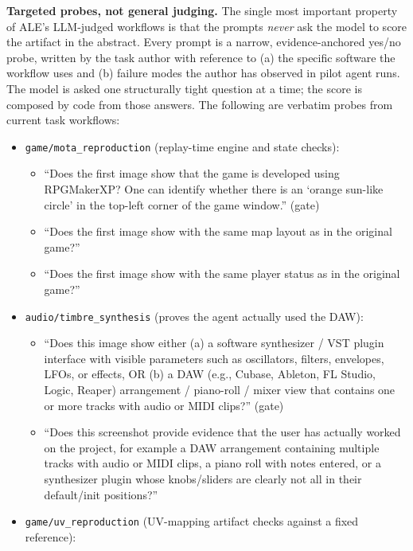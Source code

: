 \documentclass{llmxive}
\begin{document}
\noindent \textbf{Targeted probes, not general judging.}
The single most important property of ALE's LLM-judged workflows is that the prompts \emph{never} ask the model to score the artifact in the abstract. Every prompt is a narrow, evidence-anchored yes/no probe, written by the task author with reference to (a) the specific software the workflow uses and (b) failure modes the author has observed in pilot agent runs. The model is asked one structurally tight question at a time; the score is composed by code from those answers. The following are verbatim probes from current task workflows:

\begin{itemize}[nosep,leftmargin=1.2em]
    \item \texttt{game/mota\_reproduction} (replay-time engine and state checks):
    \begin{itemize}[nosep,leftmargin=1.2em]
        \item ``Does the first image show that the game is developed using RPGMakerXP? One can identify whether there is an `orange sun-like circle' in the top-left corner of the game window.'' (gate)
        \item ``Does the first image show with the same map layout as in the original game?''
        \item ``Does the first image show with the same player status as in the original game?''
    \end{itemize}
    \item \texttt{audio/timbre\_synthesis} (proves the agent actually used the DAW):
    \begin{itemize}[nosep,leftmargin=1.2em]
        \item ``Does this image show either (a) a software synthesizer / VST plugin interface with visible parameters such as oscillators, filters, envelopes, LFOs, or effects, OR (b) a DAW (e.g., Cubase, Ableton, FL Studio, Logic, Reaper) arrangement / piano-roll / mixer view that contains one or more tracks with audio or MIDI clips?'' (gate)
        \item ``Does this screenshot provide evidence that the user has actually worked on the project, for example a DAW arrangement containing multiple tracks with audio or MIDI clips, a piano roll with notes entered, or a synthesizer plugin whose knobs/sliders are clearly not all in their default/init positions?''
    \end{itemize}
    \item \texttt{game/uv\_reproduction} (UV-mapping artifact checks against a fixed reference):

\end{itemize}
\end{document}
